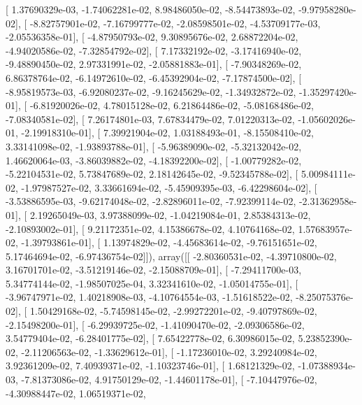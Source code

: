 \documentclass{article}
\begin{document}
       [  1.37690329e-03,  -1.74062281e-02,   8.98486050e-02,
         -8.54473893e-02,  -9.97958280e-02],
       [ -8.82757901e-02,  -7.16799777e-02,  -2.08598501e-02,
         -4.53709177e-03,  -2.05536358e-01],
       [ -4.87950793e-02,   9.30895676e-02,   2.68872204e-02,
         -4.94020586e-02,  -7.32854792e-02],
       [  7.17332192e-02,  -3.17416940e-02,  -9.48890450e-02,
          2.97331991e-02,  -2.05881883e-01],
       [ -7.90348269e-02,   6.86378764e-02,  -6.14972610e-02,
         -6.45392904e-02,  -7.17874500e-02],
       [ -8.95819573e-03,  -6.92080237e-02,  -9.16245629e-02,
         -1.34932872e-02,  -1.35297420e-01],
       [ -6.81920026e-02,   4.78015128e-02,   6.21864486e-02,
         -5.08168486e-02,  -7.08340581e-02],
       [  7.26174801e-03,   7.67834479e-02,   7.01220313e-02,
         -1.05602026e-01,  -2.19918310e-01],
       [  7.39921904e-02,   1.03188493e-01,  -8.15508410e-02,
          3.33141098e-02,  -1.93893788e-01],
       [ -5.96389090e-02,  -5.32132042e-02,   1.46620064e-03,
         -3.86039882e-02,  -4.18392200e-02],
       [ -1.00779282e-02,  -5.22104531e-02,   5.73847689e-02,
          2.18142645e-02,  -9.52345788e-02],
       [  5.00984111e-02,  -1.97987527e-02,   3.33661694e-02,
         -5.45909395e-03,  -6.42298604e-02],
       [ -3.53886595e-03,  -9.62174048e-02,  -2.82896011e-02,
         -7.92399114e-02,  -2.31362958e-01],
       [  2.19265049e-03,   3.97388099e-02,  -1.04219084e-01,
          2.85384313e-02,  -2.10893002e-01],
       [  9.21172351e-02,   4.15386678e-02,   4.10764168e-02,
          1.57683957e-02,  -1.39793861e-01],
       [  1.13974829e-02,  -4.45683614e-02,  -9.76151651e-02,
          5.17464694e-02,  -6.97436754e-02]]), array([[ -2.80360531e-02,  -4.39710800e-02,   3.16701701e-02,
         -3.51219146e-02,  -2.15088709e-01],
       [ -7.29411700e-03,   5.34774144e-02,  -1.98507025e-04,
          3.32341610e-02,  -1.05014755e-01],
       [ -3.96747971e-02,   1.40218908e-03,  -4.10764554e-03,
         -1.51618522e-02,  -8.25075376e-02],
       [  1.50429168e-02,  -5.74598145e-02,  -2.99272201e-02,
         -9.40797869e-02,  -2.15498200e-01],
       [ -6.29939725e-02,  -1.41090470e-02,  -2.09306586e-02,
          3.54779404e-02,  -6.28401775e-02],
       [  7.65422778e-02,   6.30986015e-02,   5.23852390e-02,
         -2.11206563e-02,  -1.33629612e-01],
       [ -1.17236010e-02,   3.29240984e-02,   3.92361209e-02,
          7.40939371e-02,  -1.10323746e-01],
       [  1.68121329e-02,  -1.07388934e-03,  -7.81373086e-02,
          4.91750129e-02,  -1.44601178e-01],
       [ -7.10447976e-02,  -4.30988447e-02,   1.06519371e-02,
\end{document}
